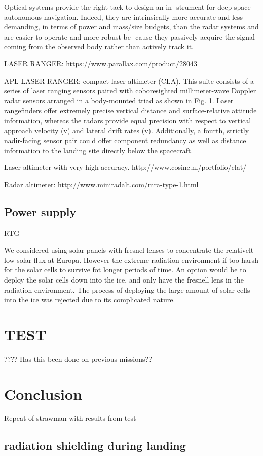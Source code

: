 Optical  systcms provide the right tack to design an in- strument for deep space autonomous navigation. Indeed, they are intrinsically more accurate and less demanding, in terms of power and mass/size budgets,  than the radar systems  and  are  easier to operate and more  robust be- cause they passively acquire the signal coming from the observed body rather than actively track it.



LASER RANGER: https://www.parallax.com/product/28043

APL LASER RANGER: compact laser altimeter (CLA). This suite consists of a series of laser ranging sensors paired with coboresighted millimeter-wave Doppler radar sensors arranged in a body-mounted triad as shown in Fig. 1. Laser rangefinders offer extremely precise vertical distance and surface-relative attitude information, whereas the radars provide equal precision with respect to vertical approach velocity (v) and lateral drift rates (v). Additionally, a fourth, strictly nadir-facing sensor pair could offer component redundancy as well as distance information to the landing site directly below the spacecraft. 

Laser altimeter with very high accuracy. http://www.cosine.nl/portfolio/clat/

Radar altimeter: http://www.miniradalt.com/mra-type-1.html 

\subsection{Power supply}

RTG

We considered using solar panels with fresnel lenses to concentrate the relativelt low solar flux at Europa. However the extreme radiation environment if too harsh for the solar cells to survive fot longer periods of time. An option would be to deploy the solar cells down into the ice, and only have the fresnell lens in the radiation environment. The process of deploying the large amount of solar cells into the ice was rejected due to its complicated nature. 

\section{TEST}
????
Has this been done on previous missions??

\section{Conclusion}
Repeat of strawman with results from test 

\subsection{radiation shielding during landing}


